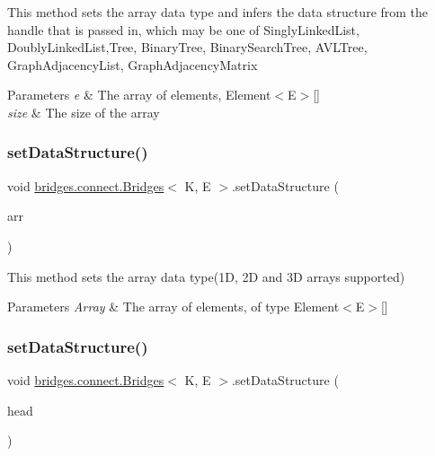 This method sets the array data type and infers the data structure from the handle that is passed in, which may be one of Singly\+Linked\+List, Doubly\+Linked\+List,Tree, Binary\+Tree, Binary\+Search\+Tree, A\+V\+L\+Tree, Graph\+Adjacency\+List, Graph\+Adjacency\+Matrix


\begin{DoxyParams}{Parameters}
{\em e} & The array of elements, Element$<$\+E$>$\mbox{[}\mbox{]} \\
\hline
{\em size} & The size of the array \\
\hline
\end{DoxyParams}
\hypertarget{classbridges_1_1connect_1_1_bridges_a2cd9af150b77b8337327ea67544a0e8f}{}\label{classbridges_1_1connect_1_1_bridges_a2cd9af150b77b8337327ea67544a0e8f} 
\subsubsection{\texorpdfstring{set\+Data\+Structure()}{setDataStructure()}\hspace{0.1cm}{\footnotesize\ttfamily [2/12]}}
{\footnotesize\ttfamily void \hyperlink{classbridges_1_1connect_1_1_bridges}{bridges.\+connect.\+Bridges}$<$ K, E $>$.set\+Data\+Structure (\begin{DoxyParamCaption}\item[{\hyperlink{classbridges_1_1base_1_1_array}{Array}$<$ E $>$}]{arr }\end{DoxyParamCaption})}

This method sets the array data type(1\+D, 2\+D and 3\+D arrays supported)


\begin{DoxyParams}{Parameters}
{\em Array} & The array of elements, of type Element$<$\+E$>$\mbox{[}\mbox{]} \\
\hline
\end{DoxyParams}
\hypertarget{classbridges_1_1connect_1_1_bridges_ae41b3d86963350ace304d8951c1863ad}{}\label{classbridges_1_1connect_1_1_bridges_ae41b3d86963350ace304d8951c1863ad} 
\subsubsection{\texorpdfstring{set\+Data\+Structure()}{setDataStructure()}\hspace{0.1cm}{\footnotesize\ttfamily [3/12]}}
{\footnotesize\ttfamily void \hyperlink{classbridges_1_1connect_1_1_bridges}{bridges.\+connect.\+Bridges}$<$ K, E $>$.set\+Data\+Structure (\begin{DoxyParamCaption}\item[{\hyperlink{classbridges_1_1base_1_1_s_lelement}{S\+Lelement}$<$ E $>$}]{head }\end{DoxyParamCaption})}

